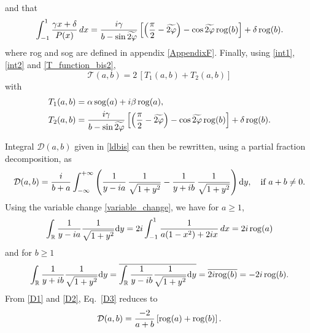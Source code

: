 and that
\begin{equation}
\label{int2}
\int_{-1}^{1} \dfrac{\gamma x + \delta}{P(x)} \, dx = \dfrac{i \gamma}{b - \sin \widetilde{2\varphi}} \left[ \left( \dfrac{\pi}{2} - \widetilde{2\varphi} \right) - \cos \widetilde{2\varphi} \, {\rm rog}(b) \right] + \delta \, {\rm rog}(b).
\end{equation}
where rog and sog are defined in appendix \ref{AppendixF}.
Finally, using \eqref{int1}, \eqref{int2} and \eqref{T_function_bis2},
\begin{equation}
\label{lt}
\mathcal{T}(a,b) = 2 \, [ T_1(a,b) + T_2(a,b) ]
\end{equation}
with
\begin{subequations}
\label{glt1}
\begin{align}
T_1(a,b) &= \alpha \, {\rm sog}(a) + i\beta \, {\rm rog}(a), \\
T_2(a,b) &= \dfrac{i \gamma}{b - \sin \widetilde{2\varphi}} \left[ \left( \dfrac{\pi}{2} - \widetilde{2\varphi} \right) - \cos \widetilde{2\varphi}  \, {\rm rog}(b) \right] + \delta \, {\rm rog}(b).
\end{align}
\end{subequations}

Integral $\mathcal{D}(a,b)$ given in \eqref{ldbis} can then be rewritten, using a partial fraction decomposition, as
\begin{equation}
\label{D3}
 \mathcal{D}(a,b) = \dfrac{i}{b+a} \int_{-\infty}^{+\infty} \left( \dfrac{1}{y - ia} \, \dfrac{1}{\sqrt{1+y^2}} - \dfrac{1}{y + ib}  \, \dfrac{1}{\sqrt{1+y^2}}  \right) {\rm d} y, \quad \text{if } a+b \neq 0.
\end{equation}
Using the variable change \eqref{variable_change}, we have for $a \geq 1$,
\begin{equation}
\label{D1}
\int_\mathbb R {1\over y-ia}{1\over \sqrt {1+y^2}}{\rm d} y  =  2i \int_{-1}^{1} \dfrac{1}{a(1-x^2)+2ix} \, dx = 2i \, {\rm rog} (a)
\end{equation}
and for $b \geq 1$
\begin{equation}
\label{D2}
\int_\mathbb R {1\over y+ib}{1\over \sqrt {1+y^2}}{\rm d} y= \overline{\int_\mathbb R  {1\over y-ib}{1\over \sqrt {1+y^2}}{\rm d} y}=\overline{2i {\rm rog}(b)}=-2i \, {\rm rog}(b).
\end{equation}
From \eqref{D1} and \eqref{D2}, Eq.~\eqref{D3} reduces to
\begin{equation}
\label{ld}
\mathcal{D}(a,b) = \dfrac{-2}{a+b} \left[ {\rm rog}(a) + {\rm rog}(b)\right].
\end{equation}

